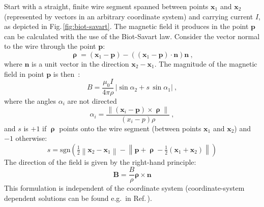 Start with a straight, finite wire segment spanned between points $\mathbf{x}_1$ and $\mathbf{x}_2$ (represented by vectors in an arbitrary coordinate system) and carrying current $I$, as depicted in Fig.\,\ref{fig:biot-savart}. The magnetic field it produces in the point $\mathbf{p}$ can be calculated with the use of the Biot-Savart law. Consider the vector normal to the wire through the point $\mathbf{p}$:
\begin{equation}
  \boldsymbol{\uprho} = (\mathbf{x}_1 - \mathbf{p}) - \left( \left( \mathbf{x}_1 - \mathbf{p} \right) \cdot \mathbf{n} \right)\mathbf{n} \ ,
\end{equation}
where $\mathbf{n}$ is a unit vector in the direction $\mathbf{x}_2 -\mathbf{x}_1$. The magnitude of the magnetic field in point $\mathbf{p}$ is then~\cite{Griffith}:
\begin{equation}
  \label{eq:biot_savart}
  B = \frac{\mu_0 I}{4 \pi \rho} \, \left| \sin \alpha_2 + s\, \sin \alpha_1 \right| \ ,
\end{equation}
where the angles $\alpha_i$ are not directed
\begin{equation}
  \alpha_i = \frac{ \left\lVert \left( \mathbf{x}_i - \mathbf{p} \right) \times \boldsymbol{\uprho} \right\rVert }{ (x_i  - p) \rho } \ ,
\end{equation}
and $s$ is $+1$ if $\boldsymbol{\uprho}$ points onto the wire segment (between points $\mathbf{x}_1$ and $\mathbf{x}_2$) and $-1$ otherwise:
\begin{equation}
  s = \mathrm{sgn}\left( \tfrac{1}{2} \left\lVert \mathbf{x}_2 - \mathbf{x}_1 \right\rVert -
  \left\lVert \mathbf{p} + \boldsymbol{\uprho} - \tfrac{1}{2} \left( \mathbf{x}_1 + \mathbf{x}_2 \right) \right\rVert \right)
\end{equation}
The direction of the field is given by the right-hand principle:
\begin{equation}
  \mathbf{B} = \frac{B}{\rho} \boldsymbol{\rho} \times \mathbf{n}
\end{equation}
This formulation is independent of the coordinate system (coordinate-system dependent solutions can be found e.g.\ in Ref.\,\cite{Grivich2000}).

